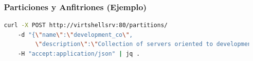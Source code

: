 \documentclass[xcolor=dvipsnames]{beamer} %
\begin{document}



\begin{frame}[fragile]
\frametitle{Particiones y Anfitriones (Ejemplo)}
\begin{lstlisting}[language=Bash,basicstyle=\ttfamily\scriptsize,keywordstyle=\color{blue}]
curl -X POST http://virtshellsrv:80/partitions/ 
    -d "{\"name\":\"development_co\",
         \"description\":\"Collection of servers oriented to development team in Colombia.\"}" 
    -H "accept:application/json" | jq .
\end{lstlisting}
\end{frame}


\end{document}
